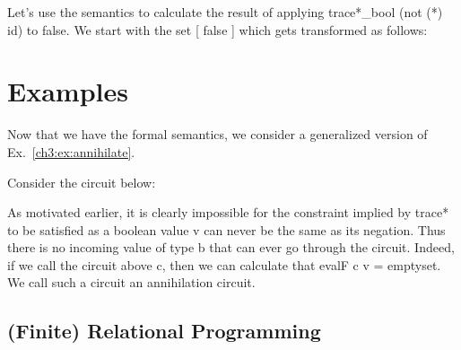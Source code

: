 \documentclass{llncs}
\begin{document}

Let's use the semantics to calculate the result of applying
{{trace*_{bool} (not (*) id)}} to {{false}}. We start
with the set {{ {[ false ]} }} which gets transformed as follows:

\section{Examples} 

Now that we have the formal semantics, we consider a generalized version of
Ex.~\ref{ch3:ex:annihilate}.

\begin{example}[Annihilation]
\label{ch3:ex;annihilation}
Consider the circuit below:
\begin{center}
\end{center}
As motivated earlier, it is clearly impossible for the constraint
implied by {{trace*}} to be satisfied as a boolean value {{v}} can
never be the same as its negation. Thus there is no incoming value of
type {{b}} that can ever go through the circuit. Indeed, if we call
the circuit above {{c}}, then we can calculate that 
{{ evalF c v = emptyset}}. We call such a circuit an 
annihilation circuit.
\end{example}

\subsection{(Finite) Relational Programming}
\label{ch3:sec:lp}
\end{document}
